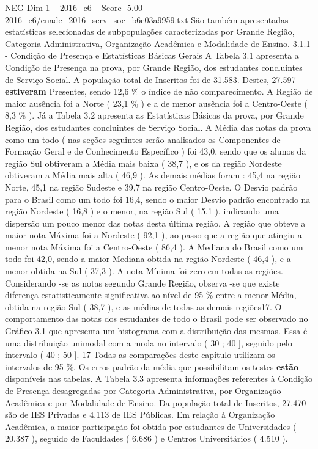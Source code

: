 \begin{textsample}{NEG Dim 1 – 2016\_c6 – Score -5.00 – 2016\_c6/enade\_2016\_serv\_soc\_b6e03a9959.txt}
São também apresentadas estatísticas selecionadas de subpopulações caracterizadas por Grande Região, Categoria Administrativa, Organização Acadêmica e Modalidade de Ensino. 3.1.1 - Condição de Presença e Estatísticas Básicas Gerais A Tabela 3.1 apresenta a Condição de Presença na prova, por Grande Região, dos estudantes concluintes de Serviço Social.
A população total de Inscritos foi de 31.583.
Destes, 27.597 \textbf{estiveram} Presentes, sendo 12,6 \% o índice de não comparecimento.
A Região de maior ausência foi a Norte ( 23,1 \% ) e a de menor ausência foi a Centro-Oeste ( 8,3 \% ).
Já a Tabela 3.2 apresenta as Estatísticas Básicas da prova, por Grande Região, dos estudantes concluintes de Serviço Social.
A Média das notas da prova como um todo ( nas seções seguintes serão analisados os Componentes de Formação Geral e de Conhecimento Específico ) foi 43,0, sendo que os alunos da região Sul obtiveram a Média mais baixa ( 38,7 ), e os da região Nordeste obtiveram a Média mais alta ( 46,9 ).
As demais médias foram : 45,4 na região Norte, 45,1 na região Sudeste e 39,7 na região Centro-Oeste.
O Desvio padrão para o Brasil como um todo foi 16,4, sendo o maior Desvio padrão encontrado na região Nordeste ( 16,8 ) e o menor, na região Sul ( 15,1 ), indicando uma dispersão um pouco menor das notas desta última região.
A região que obteve a maior nota Máxima foi a Nordeste ( 92,1 ), ao passo que a região que atingiu a menor nota Máxima foi a Centro-Oeste ( 86,4 ).
A Mediana do Brasil como um todo foi 42,0, sendo a maior Mediana obtida na região Nordeste ( 46,4 ), e a menor obtida na Sul ( 37,3 ).
A nota Mínima foi zero em todas as regiões.
Considerando -se as notas segundo Grande Região, observa -se que existe diferença estatisticamente significativa ao nível de 95 \% entre a menor Média, obtida na região Sul ( 38,7 ), e as médias de todas as demais regiões17.
O comportamento das notas dos estudantes de todo o Brasil pode ser observado no Gráfico 3.1 que apresenta um histograma com a distribuição das mesmas.
Essa é uma distribuição unimodal com a moda no intervalo ( 30 ; 40 ], seguido pelo intervalo ( 40 ; 50 ]. 17 Todas as comparações deste capítulo utilizam os intervalos de 95 \%.
Os erros-padrão da média que possibilitam os testes \textbf{estão} disponíveis nas tabelas.
A Tabela 3.3 apresenta informações referentes à Condição de Presença desagregadas por Categoria Administrativa, por Organização Acadêmica e por Modalidade de Ensino.
Da população total de Inscritos, 27.470 são de IES Privadas e 4.113 de IES Públicas.
Em relação à Organização Acadêmica, a maior participação foi obtida por estudantes de Universidades ( 20.387 ), seguido de Faculdades ( 6.686 ) e Centros Universitários ( 4.510 ).

\end{textsample}
